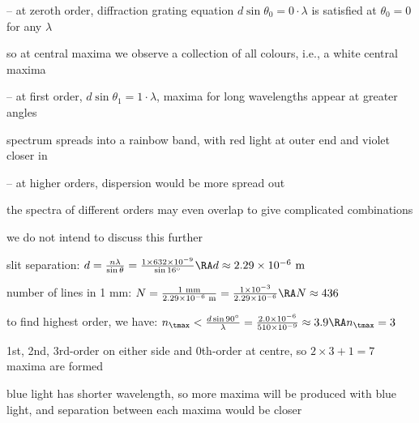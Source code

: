 \begin{compactitem}
	\item[--] at zeroth order, diffraction grating equation $d\sin\theta_0 = 0\cdot\lambda$ is satisfied at $\theta_0 = 0$ for any $\lambda$
	
	so at central maxima we observe a collection of all colours, i.e., a white central maxima
	
	\item[--] at first order, $d\sin\theta_1 = 1\cdot\lambda$, maxima for long wavelengths appear at greater angles
	
	spectrum spreads into a rainbow band, with red light at outer end and violet closer in
	
	\item[--] at higher orders, dispersion would be more spread out 
	
	the spectra of different orders may even overlap to give complicated combinations
	
	we do not intend to discuss this further
\end{compactitem}




\sol slit separation: $d = \frac{n\lambda}{\sin\theta} = \frac{1\times632\times10^{-9}}{\sin 16^\circ} \RA d \approx 2.29 \times 10^{-6} \text{ m}$

number of lines in 1 mm: $N = \frac{1 \text{ mm}}{2.29 \times 10^{-6} \text{ m}} = \frac{1 \times 10^{-3}}{2.29 \times 10^{-6}} \RA N \approx 436$ \eoe


\sol to find highest order, we have: $n_\tmax < \frac{d\sin 90^\circ}{\lambda} = \frac{2.0\times10^{-6}}{510\times10^{-9}} \approx 3.9 \RA n_\tmax = 3$

1st, 2nd, 3rd-order on either side and 0th-order at centre, so $ 2\times 3 + 1 = 7$ maxima are formed

blue light has shorter wavelength, so more maxima will be produced with blue light, and separation between each maxima would be closer \eoe

